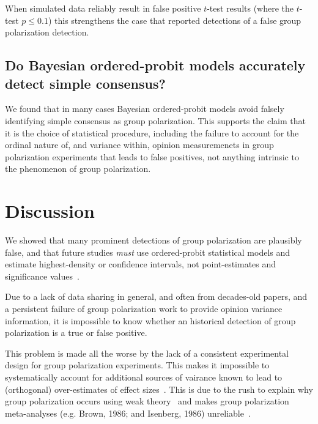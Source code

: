 \documentclass[12pt, letterpaper]{article}
\begin{document}
When simulated data reliably result in false positive $t$-test results (where
the $t$-test $p \le 0.1$) this strengthens the case that reported detections
of a false group polarization detection.


% 


\subsection{Do Bayesian ordered-probit models accurately detect simple consensus?}

We found that in many cases Bayesian ordered-probit models avoid falsely identifying simple
consensus as group polarization. This supports the claim that it is the choice of statistical
procedure, including the failure to account for the ordinal nature of, and variance within,
opinion measuremenets in group polarization experiments that leads to false
positives, not anything intrinsic to the phenomenon of group polarization.


\section{Discussion}

We showed that many prominent detections of group polarization are plausibly
false, and that future studies \emph{must} use ordered-probit statistical
models and estimate highest-density or confidence intervals, not point-estimates 
and significance values~\cite{Meehl1997}.

Due to a lack of data sharing in general, and often from decades-old papers, and a persistent 
failure of group polarization work to provide opinion variance information, 
it is impossible to know whether an historical detection of group polarization
is a true or false positive. 

This problem is made all the worse by the lack of a consistent experimental design for group
polarization experiments. This makes it impossible to systematically account for
additional sources of vairance known to lead to (orthogonal) over-estimates
of effect sizes~\cite{Yarkoni2021}. This is due to the rush to explain why 
group polarization occurs using weak theory~\cite{Cartwright1971,Cartwright1973} and makes
group polarization meta-analyses (e.g. Brown, 1986; and Isenberg, 1986)\nocite{Brown1986,Isenberg1986}
unreliable~\cite{Meehl1990,Meehl1997}.
\end{document}
